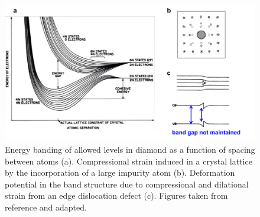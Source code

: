 \documentclass[11pt, twoside]{report}
\begin{document}
\begin{figure}[h!]
  \centering
    \includegraphics[width=1.0\textwidth]{figures/pankove_band_fluc.png}
    \caption[Energy banding of allowed levels in diamond as a function of spacing between atoms (a). Compressional strain induced in a crystal lattice by the incorporation of a large impurity atom (b). Deformation potential in the band structure due to compressional and dilational strain from an edge dislocation defect (c).]{Energy banding of allowed levels in diamond as a function of spacing between atoms (a). Compressional strain induced in a crystal lattice by the incorporation of a large impurity atom (b). Deformation potential in the band structure due to compressional and dilational strain from an edge dislocation defect (c). Figures taken from reference  and adapted.}
  \label{pankove_band_fluc}
\end{figure}
\end{document}
